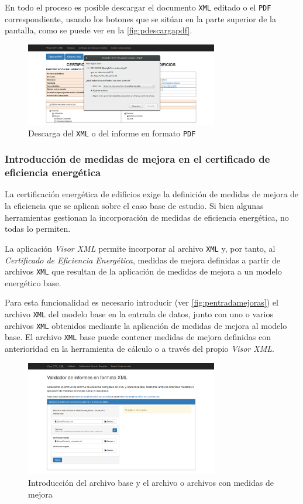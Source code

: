 \documentclass[10pt,notitlepage,oneside,a4paper]{article}
\begin{document}
En todo el proceso es posible descargar el documento \texttt{XML} editado o el \texttt{PDF} correspondiente, usando los botones que se sitúan en la parte superior de la pantalla, como se puede ver en la \autoref{fig:pdescargapdf}.

\begin{figure}[H]
  \centering
  \includegraphics[width=0.75\textwidth]{imagenes/pdescargapdf}  
  \caption{Descarga del \texttt{XML} o del informe en formato \texttt{PDF}}
  \label{fig:pdescargapdf}
\end{figure}

\subsubsection{Introducción de medidas de mejora en el certificado de eficiencia energética}

La certificación energética de edificios exige la definición de medidas de mejora de la eficiencia que se aplican sobre el caso base de estudio. Si bien algunas herramientas gestionan la incorporación de medidas de eficiencia energética, no todas lo permiten.

La aplicación \textit{Visor XML} permite incorporar al archivo \texttt{XML} y, por tanto, al \textit{Certificado de Eficiencia Energética}, medidas de mejora definidas a partir de archivos \texttt{XML} que resultan de la aplicación de medidas de mejora a un modelo energético base.

Para esta funcionalidad es necesario introducir (ver \autoref{fig:pentradamejoras}) el archivo \texttt{XML} del modelo base en la entrada de datos, junto con uno o varios archivos \texttt{XML} obtenidos mediante la aplicación de medidas de mejora al modelo base. El archivo \texttt{XML} base puede contener medidas de mejora definidas con anterioridad en la herramienta de cálculo o a través del propio \textit{Visor XML}.

\begin{figure}[H]
  \centering
  \includegraphics[width=0.75\textwidth]{imagenes/pantalla_entradadatos_mejorado}  
  \caption{Introducción del archivo base y el archivo o archivos con medidas de mejora}
  \label{fig:pentradamejoras}
\end{figure}
\end{document}
